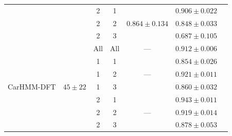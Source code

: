 \begin{table}[ht]
{\begin{tabular}{ccccccc}
                            &                                    & 2                             & 1                                & \multirow{3}{*}{$0.864\pm0.134$}    & $0.906 \pm 0.022$                       \\ 
                            &                                    & 2                             & 2                                &                                   & $0.848 \pm 0.033$                       \\
                            &                                    & 2                             & 3                                &                                   & $0.687 \pm 0.105$                       \\ \hline
\multirow{7}{*}{CarHMM-DFT} & \multirow{7}{*}{$45 \pm 22$}   & All                           & All                              & ---                                   & $0.912 \pm 0.006$                       \\
                            &                                    & 1                             & 1                                & \multirow{3}{*}{---          }    & $0.854 \pm 0.026$                       \\
                            &                                    & 1                             & 2                                &                                   & $0.921 \pm 0.011$                       \\                            
                            &                                    & 1                             & 3                                &                                   & $0.860 \pm 0.032$                       \\ 
                            &                                    & 2                             & 1                                & \multirow{3}{*}{---          }    & $0.943 \pm 0.011$                       \\ 
                            &                                    & 2                             & 2                                &                                   & $0.919 \pm 0.014$                       \\ 
                            &                                    & 2                             & 3                                &                                   & $0.878 \pm 0.053$                       \\ \hline
\end{tabular}
}

\label{table:accuracy}
\end{table}

